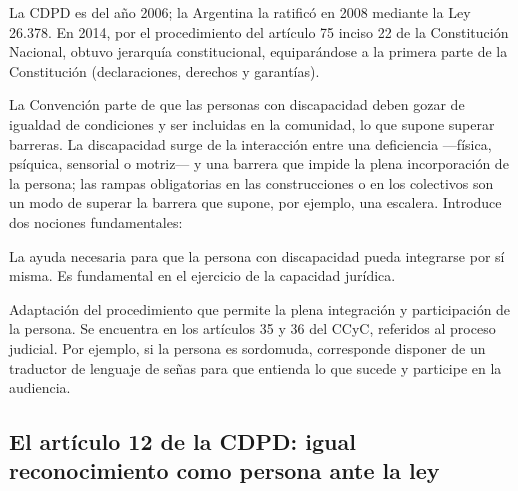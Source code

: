 \documentclass[12pt,oneside]{book}
\begin{document}
La CDPD es del año 2006; la Argentina la ratificó en 2008 mediante la Ley 26.378. En 2014, por el procedimiento del artículo 75 inciso 22 de la Constitución Nacional, obtuvo jerarquía constitucional, equiparándose a la primera parte de la Constitución (declaraciones, derechos y garantías). %

La Convención parte de que las personas con discapacidad deben gozar de igualdad de condiciones y ser incluidas en la comunidad, lo que supone superar barreras. La discapacidad surge de la interacción entre una deficiencia ---física, psíquica, sensorial o motriz--- y una barrera que impide la plena incorporación de la persona; las rampas obligatorias en las construcciones o en los colectivos son un modo de superar la barrera que supone, por ejemplo, una escalera. Introduce dos nociones fundamentales:

\begin{definicion}
La ayuda necesaria para que la persona con discapacidad pueda integrarse por sí misma. Es fundamental en el ejercicio de la capacidad jurídica.
\end{definicion}

\begin{definicion}
Adaptación del procedimiento que permite la plena integración y participación de la persona. Se encuentra en los artículos 35 y 36 del CCyC, referidos al proceso judicial. Por ejemplo, si la persona es sordomuda, corresponde disponer de un traductor de lenguaje de señas para que entienda lo que sucede y participe en la audiencia.
\end{definicion}

\subsection{El artículo 12 de la CDPD: igual reconocimiento como persona ante la ley}
\end{document}
